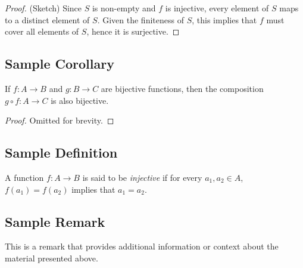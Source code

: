 \begin{proof}
(Sketch) Since \( S \) is non-empty and \( f \) is injective, every element of \( S \) maps to a distinct element of \( S \). Given the finiteness of \( S \), this implies that \( f \) must cover all elements of \( S \), hence it is surjective.
\end{proof}


\subsection{Sample Corollary}
\begin{corollary}
If \( f: A \to B \) and \( g: B \to C \) are bijective functions, then the composition \( g \circ f: A \to C \) is also bijective.
\end{corollary}

\begin{proof}
Omitted for brevity.
\end{proof}

\subsection{Sample Definition}
\begin{definition}
A function \( f: A \to B \) is said to be \emph{injective} if for every \( a_1, a_2 \in A \), \( f(a_1) = f(a_2) \) implies that \( a_1 = a_2 \).
\end{definition}

\subsection{Sample Remark}
\begin{remark}
This is a remark that provides additional information or context about the material presented above.
\end{remark}
